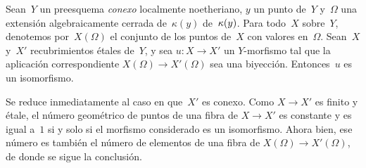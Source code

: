 \begin{proposition}
\label{V.3.7}
Sean~$Y$ un preesquema \emph{conexo} localmente noetheriano, $y$ un punto
de~$Y$ y~$\mathit{\Omega}$ una extensión algebraicamente cerrada
{de~$\kappa(y)$}
{de~$\kappa(y)$}.
Para todo~$X$ sobre~$Y$, denotemos por~$X(\Omega)$ el conjunto de los puntos
de~$X$ con valores en~$\Omega$. Sean~$X$ y~$X'$ recubrimientos étales de~$Y$,
y sea $u\colon X\to X'$ un $Y$-morfismo tal que la aplicación correspondiente
$X(\Omega)\to X'(\Omega)$ sea una biyección. Entonces~$u$ es un isomorfismo.
\end{proposition}

Se reduce inmediatamente al caso en que~$X'$ es conexo. Como $X\to X'$ es
finito y étale, el número geométrico de puntos de una fibra de $X\to X'$ es
constante y es igual a~$1$ si y solo si el morfismo considerado es un
isomorfismo. Ahora bien, ese número es también el número de elementos de una
fibra de $X(\Omega)\to X'(\Omega)$, de donde se sigue la conclusión.
{\enlargethispage{.5cm}}%
